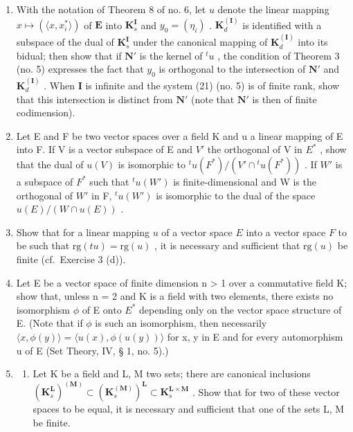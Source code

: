 \begin{enumerate}
\def\labelenumi{\arabic{enumi}.}
\setcounter{enumi}{20}
\item
  With the notation of Theorem 8 of no. 6, let \(u\) denote the linear mapping \(x \mapsto (\langle x, x_i^* \rangle)\) of \(\mathbf{E}\) into \(\mathbf{K}_s^{\mathbf{I}}\) and \(y_0 = (\eta_i)\) . \(\mathbf{K}_d^{(\mathbf{I})}\) is identified with a subspace of the dual of \(\mathbf{K}_s^{\mathbf{I}}\) under the canonical mapping of \(\mathbf{K}_d^{(\mathbf{I})}\) into its bidual; then show that if \(\mathbf{N}'\) is the kernel of \(^t u\) , the condition of Theorem 3 (no. 5) expresses the fact that \(y_0\) is orthogonal to the intersection of \(\mathbf{N}'\) and \(\mathbf{K}_d^{(\mathbf{I})}\) . When \(\mathbf{I}\) is infinite and the system (21) (no. 5) is of finite rank, show that this intersection is distinct from \(\mathbf{N}'\) (note that \(\mathbf{N}'\) is then of finite codimension).
\item
  Let E and F be two vector spaces over a field K and u a linear mapping of E into F. If V is a vector subspace of E and \(V'\) the orthogonal of V in \(E^{*}\) , show that the dual of \(u(V)\) is isomorphic to \({}^{t}u(F^{*})/(V'\cap{}^{t}u(F^{*}))\) . If \(W'\) is a subspace of \(F^{*}\) such that \({}^{t}u(W')\) is finite-dimensional and W is the orthogonal of \(W'\) in F, \({}^{t}u(W')\) is isomorphic to the dual of the space \(u(E)/(W\cap u(E))\) .
\item
  Show that for a linear mapping \(u\) of a vector space \(E\) into a vector space \(F\) to be such that \(\mathrm{rg}(t u) = \mathrm{rg}(u)\) , it is necessary and sufficient that \(\mathrm{rg}(u)\) be finite (cf.~Exercise 3 (d)).
\item
  Let E be a vector space of finite dimension n \textgreater{} 1 over a commutative field K; show that, unless n = 2 and K is a field with two elements, there exists no isomorphism \(\phi\) of E onto \(E^{*}\) depending only on the vector space structure of E. (Note that if \(\phi\) is such an isomorphism, then necessarily \(\langle x, \phi(y) \rangle = \langle u(x), \phi(u(y)) \rangle\) for x, y in E and for every automorphism u of E (Set Theory, IV, § 1, no. 5).)
\item
  \begin{enumerate}
  \def\labelenumii{(\alph{enumii})}
  \tightlist
  \item
    Let K be a field and L, M two sets; there are canonical inclusions \((\mathbf{K}_{s}^{\mathbf{L}})^{(\mathbf{M})}\subset(\mathbf{K}_{s}^{(\mathbf{M})})^{\mathbf{L}}\subset\mathbf{K}_{s}^{\mathbf{L}\times\mathbf{M}}\) . Show that for two of these vector spaces to be equal, it is necessary and sufficient that one of the sets L, M be finite.
  \end{enumerate}
\end{enumerate}

